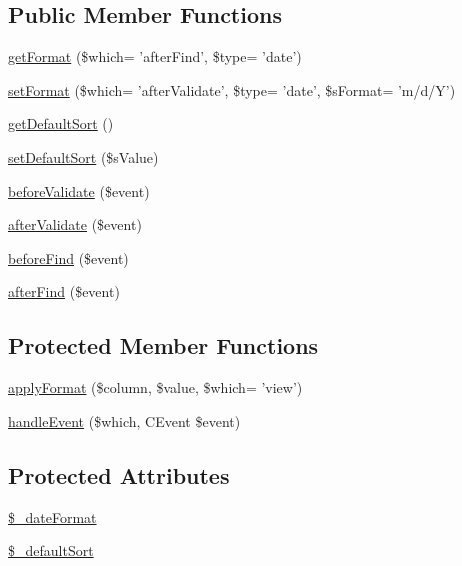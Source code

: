 \subsection*{Public Member Functions}
\begin{DoxyCompactItemize}
\item 
\hyperlink{classCPSDataFormatBehavior_aad7e15be495655b98d24409956a439bc}{getFormat} (\$which= 'afterFind', \$type= 'date')
\item 
\hyperlink{classCPSDataFormatBehavior_aa062fdbc726af94e788936d25ee531e4}{setFormat} (\$which= 'afterValidate', \$type= 'date', \$sFormat= 'm/d/Y')
\item 
\hyperlink{classCPSDataFormatBehavior_afeb8c05903b3b31d7ec509c3e1628e52}{getDefaultSort} ()
\item 
\hyperlink{classCPSDataFormatBehavior_ad6a3597dea15d20d248e402b0d162490}{setDefaultSort} (\$sValue)
\item 
\hyperlink{classCPSDataFormatBehavior_a586e177c0e7073ec63f7ccd6546ff3fd}{beforeValidate} (\$event)
\item 
\hyperlink{classCPSDataFormatBehavior_a5c1ea11a48a8c9bde21ef9a7d391d396}{afterValidate} (\$event)
\item 
\hyperlink{classCPSDataFormatBehavior_a0d137abaa3f9f1ae67349e02c627ac26}{beforeFind} (\$event)
\item 
\hyperlink{classCPSDataFormatBehavior_a3b701d16073e1628451c7dc1929b66bb}{afterFind} (\$event)
\end{DoxyCompactItemize}
\subsection*{Protected Member Functions}
\begin{DoxyCompactItemize}
\item 
\hyperlink{classCPSDataFormatBehavior_a826182a47d36956417205828f9df2f61}{applyFormat} (\$column, \$value, \$which= 'view')
\item 
\hyperlink{classCPSDataFormatBehavior_a976f0f5f7deb665d9a23c095f407ef2e}{handleEvent} (\$which, CEvent \$event)
\end{DoxyCompactItemize}
\subsection*{Protected Attributes}
\begin{DoxyCompactItemize}
\item 
\hyperlink{classCPSDataFormatBehavior_a83797c01913ca1386c15c67d871c69ef}{\$\_\-dateFormat}
\item 
\hyperlink{classCPSDataFormatBehavior_a295ce02e7bc05505ee0456d4292c3418}{\$\_\-defaultSort}
\end{DoxyCompactItemize}


